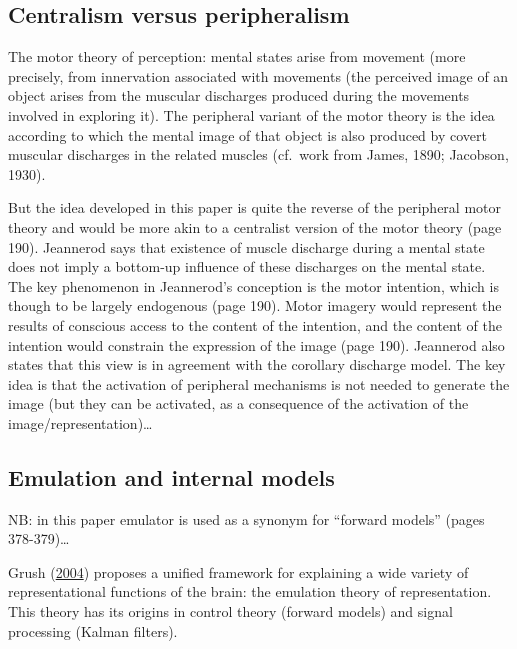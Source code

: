 \documentclass[a4paper,12pt,twoside,openright,oldfontcommands]{memoir}
\begin{document}
\subsection{Centralism versus
peripheralism}\label{centralism-versus-peripheralism}

The motor theory of perception: mental states arise from movement (more
precisely, from innervation associated with movements (the perceived
image of an object arises from the muscular discharges produced during
the movements involved in exploring it). The peripheral variant of the
motor theory is the idea according to which the mental image of that
object is also produced by covert muscular discharges in the related
muscles (cf.~work from James, 1890; Jacobson, 1930).

But the idea developed in this paper is quite the reverse of the
peripheral motor theory and would be more akin to a centralist version
of the motor theory (page 190). Jeannerod says that existence of muscle
discharge during a mental state does not imply a bottom-up influence of
these discharges on the mental state. The key phenomenon in Jeannerod's
conception is the motor intention, which is though to be largely
endogenous (page 190). Motor imagery would represent the results of
conscious access to the content of the intention, and the content of the
intention would constrain the expression of the image (page 190).
Jeannerod also states that this view is in agreement with the corollary
discharge model. The key idea is that the activation of peripheral
mechanisms is not needed to generate the image (but they can be
activated, as a consequence of the activation of the
image/representation)\ldots{}

\subsection{Emulation and internal
models}\label{emulation-and-internal-models}

NB: in this paper emulator is used as a synonym for ``forward models''
(pages 378-379)\ldots{}

Grush (\protect\hyperlink{ref-grush_emulation_2004}{2004}) proposes a
unified framework for explaining a wide variety of representational
functions of the brain: the emulation theory of representation. This
theory has its origins in control theory (forward models) and signal
processing (Kalman filters).
\end{document}
